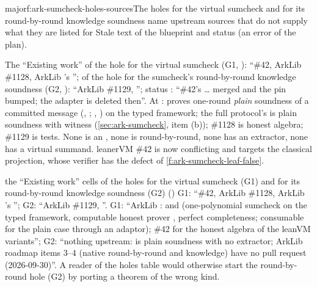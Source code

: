 \begin{finding}{major}{f:ark-sumcheck-holes-sources}{The holes for the virtual sumcheck and for its round-by-round knowledge soundness name upstream sources that do not supply what they are listed for}
 Stale text of the blueprint and status (an error of the plan).

 The ``Existing work'' of the hole for the virtual sumcheck (G1, ):
``\#42, ArkLib \#1128, ArkLib 's ''; of the hole for the
sumcheck's round-by-round knowledge soundness (G2, ): ``ArkLib \#1129,
''; status : ``\#42's
 \ldots{} merged and the pin bumped; the adapter is deleted
then''. At :  proves one-round
\emph{plain} soundness of a committed message (, ;
, ) on the typed framework; the full
protocol's  is plain soundness with  witness
(\cref{sec:ark-sumcheck}, item (b)); \#1128 is honest algebra; \#1129 is tests. None is an
, none is round-by-round, none has an extractor, none has a virtual
summand. leanerVM \#42 is now conflicting and targets the classical  projection,
whose verifier has the defect of \cref{f:ark-sumcheck-leaf-false}.

\begin{change}{the ``Existing work'' cells of the holes for the virtual sumcheck (G1) and for its round-by-round knowledge soundness (G2) ()}
\asis G1: ``\#42, ArkLib \#1128, ArkLib 's ''; G2:
``ArkLib \#1129, ''.
\asproposed G1: ``ArkLib :  and
 (one-polynomial sumcheck on the typed framework, computable honest prover
, perfect completeness; consumable for the plain case
through an  adaptor); \#42 for the honest algebra of the leanVM
variants''; G2: ``nothing upstream:  is plain soundness with no
extractor; ArkLib roadmap items 3--4 (native round-by-round and knowledge) have no pull request
(2026-09-30)''.
\reason A reader of the holes table would otherwise start the round-by-round hole (G2) by
porting a theorem of the wrong kind.
\end{change}
\end{finding}

